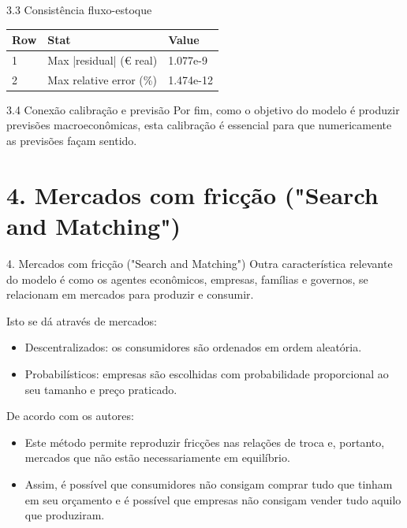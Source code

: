 \documentclass[aspectratio=169,11pt]{beamer}
\begin{document}
\begin{frame}{3.3 Consistência fluxo-estoque}
\small
\begin{tabularx}{\textwidth}{lXX}
Row & Stat & Value \\
\hline
1 & Max |residual| (€ real) & 1.077e-9 \\
2 & Max relative error (\%) & 1.474e-12 \\
\end{tabularx}
\end{frame}


\begin{frame}[allowframebreaks]{3.4 Conexão calibração e previsão}
\normalsize
Por fim, como o objetivo do modelo é produzir previsões macroeconômicas, esta calibração é essencial para que numericamente as previsões façam sentido.
\end{frame}


\section{4. Mercados com fricção  ("Search and Matching")}

\begin{frame}[allowframebreaks]{4. Mercados com fricção  ("Search and Matching")}
\normalsize
Outra característica relevante do modelo é como os agentes econômicos, empresas, famílias e governos, se relacionam em mercados para produzir e consumir.

Isto se dá através de mercados:

\begin{itemize}
\item
  Descentralizados: os consumidores são ordenados em ordem aleatória.
\item
  Probabilísticos: empresas são escolhidas com probabilidade proporcional ao seu tamanho e preço praticado.
\end{itemize}

De acordo com os autores:

\begin{itemize}
\item
  Este método permite reproduzir fricções nas relações de troca e, portanto, mercados que não estão necessariamente em equilíbrio.
\item
  Assim, é possível que consumidores não consigam comprar tudo que tinham em seu orçamento e é possível que empresas não consigam vender tudo aquilo que produziram.
\end{itemize}
\end{frame}
\end{document}
